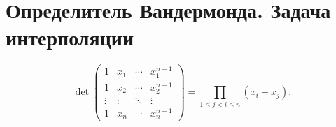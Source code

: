 \section{Определитель Вандермонда. Задача интерполяции}

\begin{theorem}
    $$
    \det
    \begin{pmatrix}
        1 & x_1 & \cdots & x_1^{n - 1}\\
        1 & x_2 & \cdots & x_2^{n - 1}\\
        \vdots & \vdots & \ddots & \vdots\\
        1 & x_n & \cdots & x_n^{n - 1}
    \end{pmatrix} =
    \prod_{1 \leqslant j < i \leqslant n}(x_i - x_j).
    $$
\end{theorem}

